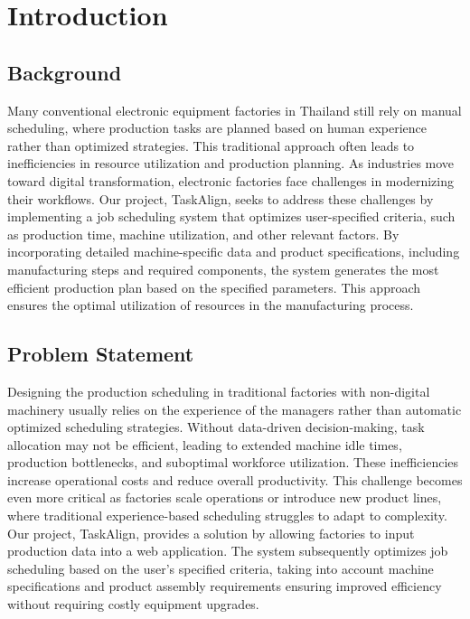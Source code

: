 \chapter{Introduction}
\label{chap:introduction}

\section{Background}
\label{section:background}

Many conventional electronic equipment factories in Thailand still rely on manual scheduling, where production tasks are planned based on human experience rather than optimized strategies. This traditional approach often leads to inefficiencies in resource utilization and production planning. As industries move toward digital transformation, electronic factories face challenges in modernizing their workflows.
Our project, TaskAlign, seeks to address these challenges by implementing a job scheduling system that optimizes user-specified criteria, such as production time, machine utilization, and other relevant factors. By incorporating detailed machine-specific data and product specifications, including manufacturing steps and required components, the system generates the most efficient production plan based on the specified parameters. This approach ensures the optimal utilization of resources in the manufacturing process.

\section{Problem Statement}
\label{section:problem-statement}

Designing the production scheduling in traditional factories with non-digital machinery usually relies on the experience of the managers rather than automatic optimized scheduling strategies. Without data-driven decision-making, task allocation may not be efficient, leading to extended machine idle times, production bottlenecks, and suboptimal workforce utilization. These inefficiencies increase operational costs and reduce overall productivity.
This challenge becomes even more critical as factories scale operations or introduce new product lines, where traditional experience-based scheduling struggles to adapt to complexity. Our project, TaskAlign, provides a solution by allowing factories to input production data into a web application. The system subsequently optimizes job scheduling based on the user's specified criteria, taking into account machine specifications and product assembly requirements ensuring improved efficiency without requiring costly equipment upgrades.


